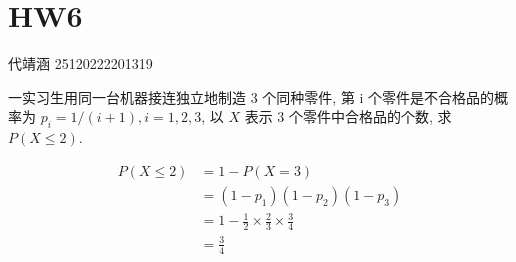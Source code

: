 \documentclass[../main.tex]{subfiles}
\begin{document}
\ifSubfilesClassLoaded{

    
    \setcounter{chapter}{5}
}{}

\chapter{ HW6 }
代靖涵 25120222201319
\begin{exercise}{}{}
    一实习生用同一台机器接连独立地制造 3 个同种零件, 第 i 个零件是不合格品的概率为 $p_i = 1/(i+1), i=1,2,3$, 以 $X$ 表示 3 个零件中合格品的个数, 求 $P(X \le 2)$.
\end{exercise}
\begin{solution}
    \[
   \begin{aligned}
   P\left( X\le 2 \right)&= 1-P\left( X= 3 \right)\\ 
    &= \left( 1-p_1 \right)\left( 1-p_2 \right)\left( 1-p_3 \right)\\ 
     &=1-\frac{1 }{2 }\times \frac{2 }{3 }\times \frac{3 }{4 }\\ 
      &= \frac{3 }{4 }      
   \end{aligned}     
    \]
\end{solution}
\end{document}
